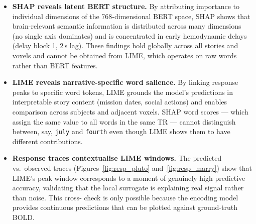 \documentclass[letterpaper,11pt]{article}
\begin{document}
\begin{itemize}
  \item \textbf{SHAP reveals latent BERT structure.}  By attributing importance
        to individual dimensions of the 768-dimensional BERT space, SHAP shows
        that brain-relevant semantic information is distributed across many
        dimensions (no single axis dominates) and is concentrated in early
        hemodynamic delays (delay block 1, 2\,s lag).  These findings hold
        globally across all stories and voxels and cannot be obtained from LIME,
        which operates on raw words rather than BERT features.

  \item \textbf{LIME reveals narrative-specific word salience.}  By linking
        response peaks to specific word tokens, LIME grounds the model's
        predictions in interpretable story content (mission dates, social
        actions) and enables comparison across subjects and adjacent voxels.
        SHAP word scores --- which assign the same value to all words in the
        same TR --- cannot distinguish between, say, \texttt{july} and
        \texttt{fourth} even though LIME shows them to have different
        contributions.

  \item \textbf{Response traces contextualise LIME windows.}  The predicted
        vs.\ observed traces (Figures~\ref{fig:resp_pluto}
        and~\ref{fig:resp_marry}) show that LIME's peak window corresponds to a
        moment of genuinely high predictive accuracy, validating that the local
        surrogate is explaining real signal rather than noise.  This cross-
        check is only possible because the encoding model provides continuous
        predictions that can be plotted against ground-truth BOLD.
\end{itemize}
\end{document}
